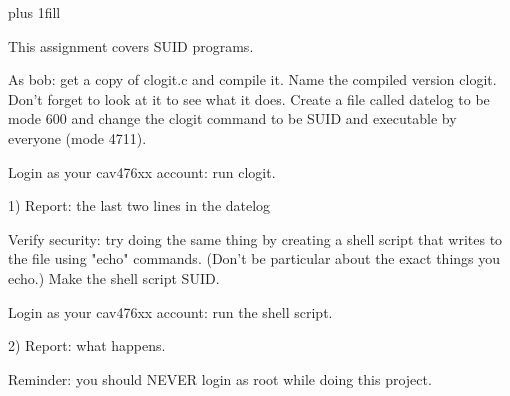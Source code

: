 
\rightskip=0pt plus 1fill

\parindent 0pt

This assignment covers SUID programs.

As bob: get a copy of {\ltt{}clogit.c} and compile it.
Name the compiled version {\ltt{}clogit}.
Don't forget to look at it to see what it does.
Create a file called {\ltt{}datelog} to be mode 600 and
change the {\ltt{}clogit} command to be SUID and executable
by everyone (mode 4711).

Login as your cav476xx account: run clogit.

1) Report: the last two lines in the datelog

Verify security: try doing the same thing by creating a shell script that
writes to the file using "echo" commands. (Don't be particular about
the exact things you echo.)
Make the shell script SUID.

Login as your cav476xx account: run the shell script.

2) Report: what happens.

Reminder: you should NEVER login as root while doing this project.
\bye
